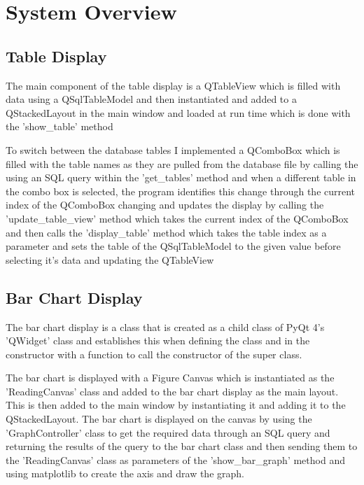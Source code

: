 \section{System Overview}

\subsection{Table Display}
The main component of the table display is a QTableView which is filled with data using a QSqlTableModel and then instantiated and added to a QStackedLayout in the main window and loaded at run time which is done with the 'show\_table' method

To switch between the database tables I implemented a QComboBox which is filled with the table names as they are pulled from the database file by calling the using an SQL query within the 'get\_tables' method and when a different table in the combo box is selected, the program identifies this change through the current index of the QComboBox changing and updates the display by calling the 'update\_table\_view' method which takes the current index of the QComboBox and then calls the 'display\_table' method which takes the table index as a parameter and sets the table of the QSqlTableModel to the given value before  selecting it's data and updating the QTableView

\subsection{Bar Chart Display}
The bar chart display is a class that is created as a child class of PyQt 4's 'QWidget' class and establishes this when defining the class and in the constructor with a function to call the constructor of the super class.

The bar chart is displayed with a Figure Canvas which is instantiated as the 'ReadingCanvas' class and added to the bar chart display as the main layout. This is then added to the main window by instantiating it and adding it to the QStackedLayout. The bar chart is displayed on the canvas by using the 'GraphController' class to get the required data through an SQL query and returning the results of the query to the bar chart class and then sending them to the 'ReadingCanvas' class as parameters of the 'show\_bar\_graph' method and using matplotlib to create the axis and draw the graph.

